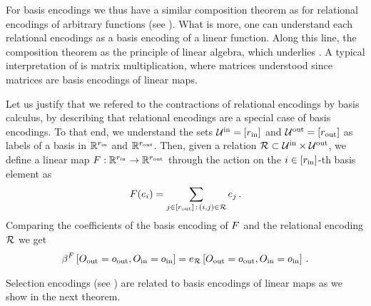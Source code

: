 For basis encodings we thus have a similar composition theorem as for relational encodings of arbitrary functions (see ).
What is more, one can understand each relational encodings as a basis encoding of a linear function.
Along this line, the composition theorem  as the principle of linear algebra, which underlies .
A typical interpretation of  is matrix multiplication, where matrices understood since matrices are basis encodings of linear maps.

\begin{example}
	Let us justify that we refered to the contractions of relational encodings by basis calculus, by describing that relational encodings are a special case of basis encodings.
	To that end, we understand the sets $\mathcal{U}^{\mathrm{in}}=[r_{\mathrm{in}}]$ and $\mathcal{U}^{\mathrm{out}}=[r_{\mathrm{out}}]$ as labels of a basis in $\mathbb{R}^{r_{\mathrm{in}}}$ and $\mathbb{R}^{r_{\mathrm{out}}}$.
	Then, given a relation $\mathcal{R} \subset \mathcal{U}^{\mathrm{in}} \times \mathcal{U}^{\mathrm{out}}$, we define a linear map $F : \mathbb{R}^{r_{\mathrm{in}}} \rightarrow \mathbb{R}^{r_{\mathrm{out}}}$ through the action on the $i\in[r_{\mathrm{in}}]$-th basis element as
	\begin{align*}
		F(e_{i}) = \sum_{j\in[r_{\mathrm{out}}]\, : \, (i,j) \in \mathcal{R}} e_{j} \, .
	\end{align*}
	Comparing the coefficients of the basis encoding of $F$ and the relational encoding $\mathcal{R}$ we get
	\begin{align*}
		\beta^{F}\left[O_{\mathrm{out}}=o_{\mathrm{out}},O_{\mathrm{in}}=o_{\mathrm{in}}\right]
		= e_{\mathcal{R}}\left[O_{\mathrm{out}}=o_{\mathrm{out}},O_{\mathrm{in}}=o_{\mathrm{in}}\right] \, .
	\end{align*}
\end{example}




Selection encodings (see ) are related to basis encodings of linear maps as we show in the next theorem.

